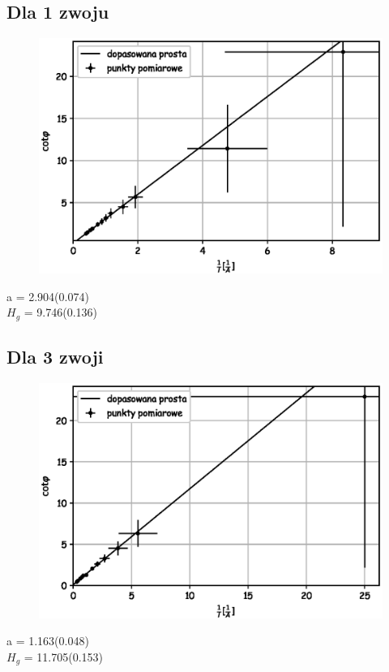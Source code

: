 \documentclass[a4paper,10pt]{article}
\begin{document}
\subsection{Dla 1 zwoju}

\begin{figure}[H]
  \includegraphics{./wykres_1.eps}
  \caption{}
  \label{}
\end{figure}
a = 2.904(0.074)\\
$H_g$ = 9.746(0.136)\\
\subsection{Dla 3 zwoji}

\begin{figure}[H]
  \includegraphics{./wykres_3.eps}
  \caption{}
  \label{}
\end{figure}
a = 1.163(0.048)\\
$H_g$ = 11.705(0.153)\\
\end{document}
